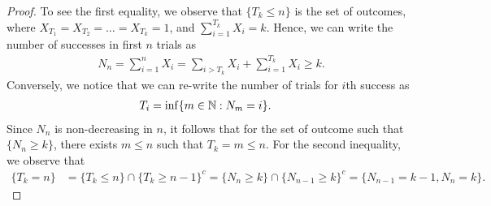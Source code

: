 \documentclass[a4paper,10pt,english]{article}
\begin{document}
\begin{proof}
To see the first equality, we observe that $\{T_k \leq n\}$ is the set of outcomes, 
where $X_{T_1} = X_{T_2} = \dots = X_{T_k} = 1$, and $\sum_{i=1}^{T_k}X_i = k$. 
Hence, we can write the number of successes in first $n$ trials as 
\begin{align*}
N_n = \sum_{i=1}^nX_i = \sum_{i > T_k}X_i + \sum_{i=1}^{T_k}X_i \geq k.
\end{align*}
Conversely, we notice that we can re-write the number of trials for $i$th success as  
\begin{align*}
T_i &= \inf\{m \in \mathbb{N}: N_m = i\}.
\end{align*}
Since $N_n$ is non-decreasing in $n$, it follows that for the set of outcome such that $\{N_n \geq k\}$, there exists $m \leq n$ such that $T_k = m \leq n$. 
For the second inequality, we observe that
\begin{align*}
\{T_k = n\} %
&= \{T_k \leq n\}\cap\{T_k \geq n-1\}^c = \{N_n \geq k\}\cap\{N_{n-1} \geq k\}^c = \{N_{n-1} = k-1, N_n = k\}. %
\end{align*}
\end{proof}
\end{document}
